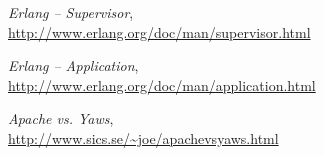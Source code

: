 \begin{thebibliography}{3}


 \emph{Erlang -- Supervisor}, \\
  \url{http://www.erlang.org/doc/man/supervisor.html}

 \emph{Erlang -- Application}, \\
  \url{http://www.erlang.org/doc/man/application.html}

 \emph{Apache vs. Yaws}, \\
  \url{http://www.sics.se/~joe/apachevsyaws.html}












\end{thebibliography}
